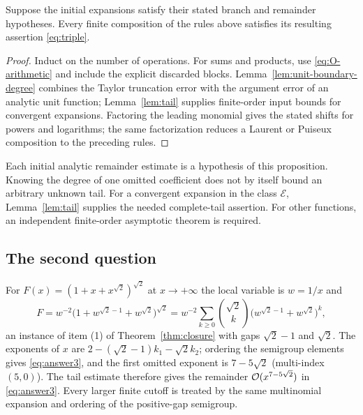 \begin{proposition}
\label{prop:soundness}
Suppose the initial expansions satisfy their stated branch and remainder hypotheses. Every finite composition of the rules above satisfies its resulting assertion \eqref{eq:triple}.
\end{proposition}
\begin{proof}
Induct on the number of operations. For sums and products, use \eqref{eq:O-arithmetic} and include the explicit discarded blocks. Lemma~\ref{lem:unit-boundary-degree} combines the Taylor truncation error with the argument error of an analytic unit function; Lemma~\ref{lem:tail} supplies finite-order input bounds for convergent expansions. Factoring the leading monomial gives the stated shifts for powers and logarithms; the same factorization reduces a Laurent or Puiseux composition to the preceding rules.
\end{proof}

Each initial analytic remainder estimate is a hypothesis of this proposition. Knowing the degree of one omitted coefficient does not by itself bound an arbitrary unknown tail. For a convergent expansion in the class $\mathcal E$, Lemma~\ref{lem:tail} supplies the needed complete-tail assertion. For other functions, an independent finite-order asymptotic theorem is required.

\subsection{The second question}

For $F(x)=(1+x+x^{\sqrt2})^{\sqrt2}$ at $x\to+\infty$ the local variable is $w=1/x$ and
\[
 F=w^{-2}\bigl(1+w^{\sqrt2-1}+w^{\sqrt2}\bigr)^{\sqrt2}=w^{-2}\sum_{k\ge0}\binom{\sqrt2}{k}\bigl(w^{\sqrt2-1}+w^{\sqrt2}\bigr)^k ,
\]
an instance of item (1) of Theorem~\ref{thm:closure} with gaps $\sqrt2-1$ and $\sqrt2$. The exponents of $x$ are $2-(\sqrt2-1)k_1-\sqrt2k_2$; ordering the semigroup elements gives \eqref{eq:answer3}, and the first omitted exponent is $7-5\sqrt2$ (multi-index $(5,0)$). The tail estimate therefore gives the remainder $\mathcal O(x^{7-5\sqrt2})$ in \eqref{eq:answer3}. Every larger finite cutoff is treated by the same multinomial expansion and ordering of the positive-gap semigroup.
